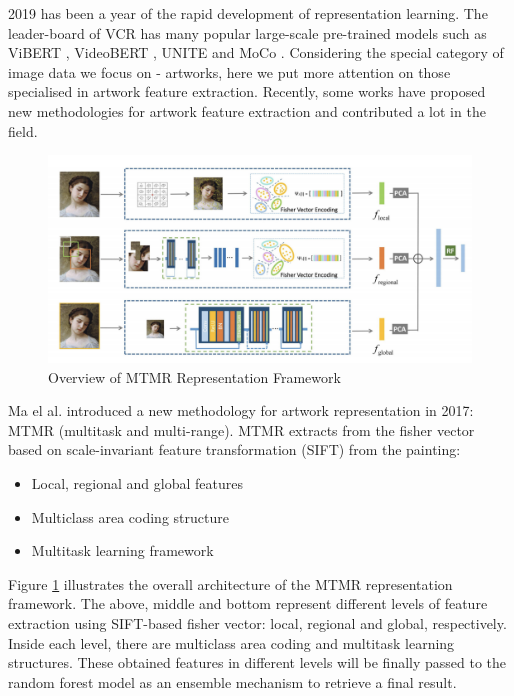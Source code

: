 2019 has been a year of the rapid development of representation learning. The leader-board of VCR \cite{zellers2019vcr} has many popular large-scale pre-trained models such as ViBERT \cite{lu2019vilbert}, VideoBERT \cite{sun2019videobert}, UNITE \cite{chen2019uniter} and MoCo \cite{he2019momentum}. Considering the special category of image data we focus on - artworks, here we put more attention on those specialised in artwork feature extraction. Recently, some works \cite{TranslatingArtworks,parttowhole,Art2Real,tan2017artgan,shen2019discovering} have proposed new methodologies for artwork feature extraction and contributed a lot in the field. 


\begin{figure}[h!]
\centering
\includegraphics[width=.95\textwidth]{MTMRoverview.pdf}
\caption{Overview of MTMR Representation Framework \cite{parttowhole}}
\label{fig:mtmroverview}
\end{figure}


Ma el al. \cite{parttowhole} introduced a new methodology for artwork representation in 2017: MTMR (multitask and multi-range). MTMR extracts from the fisher vector based on scale-invariant feature transformation (SIFT) from the painting:

\begin{itemize}
    \item Local, regional and global features
    \item Multiclass area coding structure
    \item Multitask learning framework
\end{itemize}

Figure \ref{fig:mtmroverview} illustrates the overall architecture of the MTMR representation framework. The above, middle and bottom represent different levels of feature extraction using SIFT-based fisher vector: local, regional and global, respectively. Inside each level, there are multiclass area coding and multitask learning structures. These obtained features in different levels will be finally passed to the random forest model as an ensemble mechanism to retrieve a final result.

